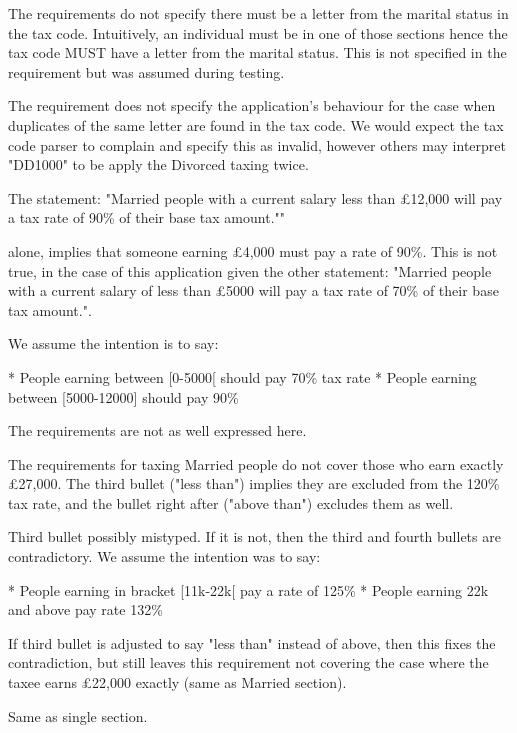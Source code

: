 The requirements do not specify there must be a letter from the marital status in the tax code. Intuitively, an individual must be in one of those sections hence the tax code MUST have a letter from the marital status. This is not specified in the requirement but was assumed during testing. 

The requirement does not specify the application's behaviour for the case when duplicates of the same letter are found in the tax code. We would expect the tax code parser to complain and specify this as invalid, however others may interpret "DD1000" to be apply the Divorced taxing twice. 


The statement: "Married people with a current salary less than £12,000 will pay a tax rate of 90\% of their base tax amount.""

alone, implies that someone earning £4,000 must pay a rate of 90\%. This is not true, in the case of this application given the other statement: "Married people with a current salary of less than £5000 will pay a tax rate of 70\% of their base tax amount.". 

We assume the intention is to say: 

* People earning between [0-5000[ should pay 70\% tax rate 
* People earning between [5000-12000] should pay 90\%

The requirements are not as well expressed here. 

The requirements for taxing Married people do not cover those who earn exactly £27,000. The third bullet ("less than") implies they are excluded from the 120\% tax rate, and the bullet right after ("above than") excludes them as well. 

Third bullet possibly mistyped. If it is not, then the third and fourth bullets are contradictory. We assume the intention was to say:  

* People earning in bracket [11k-22k[ pay a rate of 125\%
* People earning 22k and above pay rate 132\%

If third bullet is adjusted to say "less than" instead of above, then this fixes the contradiction, but still leaves this requirement not covering the case where the taxee earns £22,000 exactly (same as Married section). 

Same as single section. 

